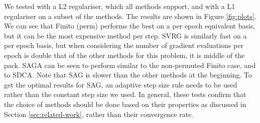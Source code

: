 \documentclass{article}
\begin{document}
We tested with a L2 regulariser, which all methods support, and with a L1 regulariser on a subset of the methods. The results are shown in Figure \ref{fig:plots}. We can see that Finito (perm) performs the best on a per epoch equivalent basis, but it can be the most expensive method per step. SVRG is similarly fast on a per epoch basis, but when considering the number of gradient evaluations per epoch is double that of the other methods for this problem, it is middle of the pack. SAGA can be seen to perform similar to the non-permuted Finito case, and to SDCA. Note that SAG is slower than the other methods at the beginning. To get the optimal results for SAG, an adaptive step size rule needs to be used rather than the constant step size we used. In general, these tests confirm that the choice of methods should be done based on their properties as discussed in Section \ref{sec:related-work}, rather than their convergence rate. 

\nocite{prox-svrg}
\nocite{nes-book}

\pagebreak




\newpage

\appendix
\end{document}
